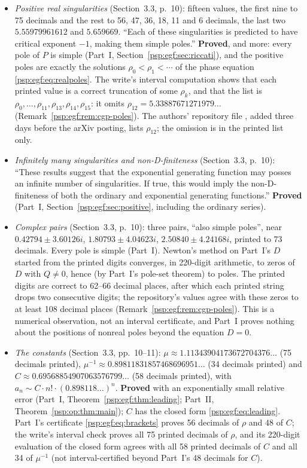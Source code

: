 \documentclass[11pt,letterpaper]{article}
\numberwithin{equation}{section}
\theoremstyle{remark}\newtheorem{remark}[theorem]{Remark}
\begin{document}
\begin{itemize}
\item \emph{Positive real singularities} (Section~3.3, p.~10): fifteen values, the first nine to 75 decimals and the rest to 56, 47, 36, 18, 11 and 6 decimals, the last two $5.55979961612$ and $5.659669$. ``Each of these singularities is predicted to have critical exponent $-1$, making them simple poles.'' \textbf{Proved}, and more: every pole of $P$ is simple (Part~I, Section~\ref{psp:egf:sec:riccati}), and the positive poles are exactly the solutions $\rho_0<\rho_1<\cdots$ of the phase equation \eqref{psp:egf:eq:realpoles}. The write's interval computation shows that each printed value is a correct truncation of some $\rho_k$, and that the list is $\rho_0,\dots,\rho_{11},\rho_{13},\rho_{14},\rho_{15}$: it omits $\rho_{12}=5.33887671271979\ldots$ (Remark~\ref{psp:egf:rem:cgp-poles}). The authors' repository file \cite{repo}, added three days before the arXiv posting, lists $\rho_{12}$; the omission is in the printed list only.
\item \emph{Infinitely many singularities and non-D-finiteness} (Section~3.3, p.~10): ``These results suggest that the exponential generating function may posses an infinite number of singularities. If true, this would imply the non-D-finiteness of both the ordinary and exponential generating functions.'' \textbf{Proved} (Part~I, Section~\ref{psp:egf:sec:positive}, including the ordinary series).
\item \emph{Complex pairs} (Section~3.3, p.~10): three pairs, ``also simple poles'', near $0.42794\pm3.60126i$, $1.80793\pm4.04623i$, $2.50840\pm4.24168i$, printed to 73 decimals. Every pole is simple (Part~I). Newton's method on Part~I's $D$ started from the printed digits converges, in 220-digit arithmetic, to zeros of $D$ with $Q\ne0$, hence (by Part~I's pole-set theorem) to poles. The printed digits are correct to 62--66 decimal places, after which each printed string drops two consecutive digits; the repository's values agree with these zeros to at least 108 decimal places (Remark~\ref{psp:egf:rem:cgp-poles}). This is a numerical observation, not an interval certificate, and Part~I proves nothing about the positions of nonreal poles beyond the equation $D=0$.
\item \emph{The constants} (Section~3.3, pp.~10--11): $\mu\approx1.11343904173672704376\ldots$ (75 decimals printed), $\mu^{-1}\approx0.89811831857468696951\ldots$ (34 decimals printed) and $C\approx0.69568854907063576799\ldots$ (58 decimals printed), with $a_n\sim C\cdot n!\cdot(0.898118\ldots)^n$. \textbf{Proved} with an exponentially small relative error (Part~I, Theorem~\ref{psp:egf:thm:leading}; Part~II, Theorem~\ref{psp:op:thm:main}); $C$ has the closed form \eqref{psp:egf:eq:leading}. Part~I's certificate \eqref{psp:egf:eq:brackets} proves 56 decimals of $\rho$ and 48 of $C$; the write's interval check proves all 75 printed decimals of $\rho$, and its 220-digit evaluation of the closed form agrees with all 58 printed decimals of $C$ and all 34 of $\mu^{-1}$ (not interval-certified beyond Part~I's 48 decimals for $C$).
\end{itemize}
\end{document}
